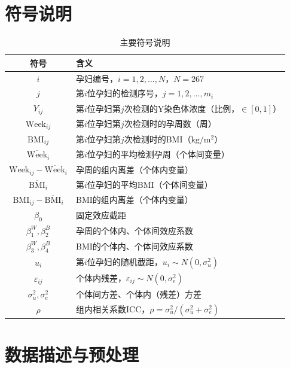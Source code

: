 \documentclass[12pt,a4paper]{ctexart}
\begin{document}
\section{符号说明}

\begin{table}[htbp]
\centering
\caption{主要符号说明}
\label{tab:symbols}
\begin{tabular}{cl}
\toprule
符号 & 含义 \\
\midrule
$i$ & 孕妇编号，$i=1,2,\dots,N$，$N=267$ \\
$j$ & 第$i$位孕妇的检测序号，$j=1,2,\dots,m_i$ \\
$Y_{ij}$ & 第$i$位孕妇第$j$次检测的Y染色体浓度（比例，$\in[0,1]$） \\
$\mathrm{Week}_{ij}$ & 第$i$位孕妇第$j$次检测时的孕周数（周） \\
$\mathrm{BMI}_{ij}$ & 第$i$位孕妇第$j$次检测时的BMI（$\mathrm{kg/m^2}$） \\
$\overline{\mathrm{Week}}_i$ & 第$i$位孕妇的平均检测孕周（个体间变量） \\
$\mathrm{Week}_{ij}-\overline{\mathrm{Week}}_i$ & 孕周的组内离差（个体内变量） \\
$\overline{\mathrm{BMI}}_i$ & 第$i$位孕妇的平均BMI（个体间变量） \\
$\mathrm{BMI}_{ij}-\overline{\mathrm{BMI}}_i$ & BMI的组内离差（个体内变量） \\
$\beta_0$ & 固定效应截距 \\
$\beta_1^W,\beta_2^B$ & 孕周的个体内、个体间效应系数 \\
$\beta_3^W,\beta_4^B$ & BMI的个体内、个体间效应系数 \\
$u_i$ & 第$i$位孕妇的随机截距，$u_i\sim N(0,\sigma_u^2)$ \\
$\varepsilon_{ij}$ & 个体内残差，$\varepsilon_{ij}\sim N(0,\sigma_e^2)$ \\
$\sigma_u^2,\sigma_e^2$ & 个体间方差、个体内（残差）方差 \\
$\rho$ & 组内相关系数ICC，$\rho=\sigma_u^2/(\sigma_u^2+\sigma_e^2)$ \\
\bottomrule
\end{tabular}
\end{table}

\section{数据描述与预处理}
\end{document}
